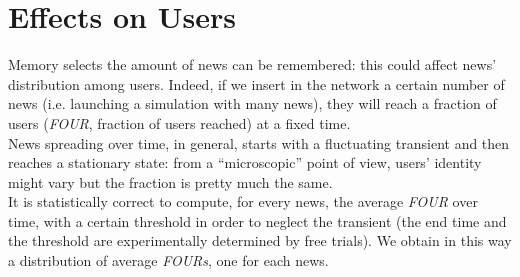 \section{Effects on Users} \label{sec:users}
Memory selects the amount of news can be remembered: this could
affect news' distribution among users.
Indeed, if we insert in the network a certain number of news
(i.e. launching a simulation with many news), they will reach a
fraction of users (\textit{FOUR}, fraction of users reached)
at a fixed time.\\
News spreading over time, in general, starts with a fluctuating
transient and then reaches a stationary state: from a ``microscopic''
point of view, users' identity might vary but the fraction is
pretty much the same. \\
It is statistically correct to compute, for every news, the average
\textit{FOUR} over time, with a certain threshold in order to
neglect the transient (the end time and the threshold are
experimentally determined by free trials).
We obtain in this  way a distribution of average \textit{FOURs},
one for each news.\\

